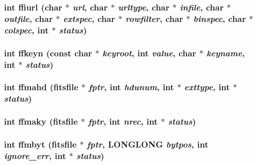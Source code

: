 \subsubsection{\setlength{\rightskip}{0pt plus 5cm}int ffiurl (char $\ast$ {\em url}, char $\ast$ {\em urltype}, char $\ast$ {\em infile}, char $\ast$ {\em outfile}, char $\ast$ {\em extspec}, char $\ast$ {\em rowfilter}, char $\ast$ {\em binspec}, char $\ast$ {\em colspec}, int $\ast$ {\em status})}\label{fitsio__64_8h_841d8003c651737bdaaf3df7507a3691}


\subsubsection{\setlength{\rightskip}{0pt plus 5cm}int ffkeyn (const char $\ast$ {\em keyroot}, int {\em value}, char $\ast$ {\em keyname}, int $\ast$ {\em status})}\label{fitsio__64_8h_8439e81e5e5ec5d57530c44db55ff774}


\subsubsection{\setlength{\rightskip}{0pt plus 5cm}int ffmahd (\bf{fitsfile} $\ast$ {\em fptr}, int {\em hdunum}, int $\ast$ {\em exttype}, int $\ast$ {\em status})}\label{fitsio__64_8h_bf55072a6e71f57598a83d1b89d9ac4d}


\subsubsection{\setlength{\rightskip}{0pt plus 5cm}int ffmaky (\bf{fitsfile} $\ast$ {\em fptr}, int {\em nrec}, int $\ast$ {\em status})}\label{fitsio__64_8h_7a704bb29df41ba2926bf18398ac67bf}


\subsubsection{\setlength{\rightskip}{0pt plus 5cm}int ffmbyt (\bf{fitsfile} $\ast$ {\em fptr}, \bf{LONGLONG} {\em bytpos}, int {\em ignore\_\-err}, int $\ast$ {\em status})}\label{fitsio__64_8h_d46d8495fae664fff9a6e7307bec570f}


